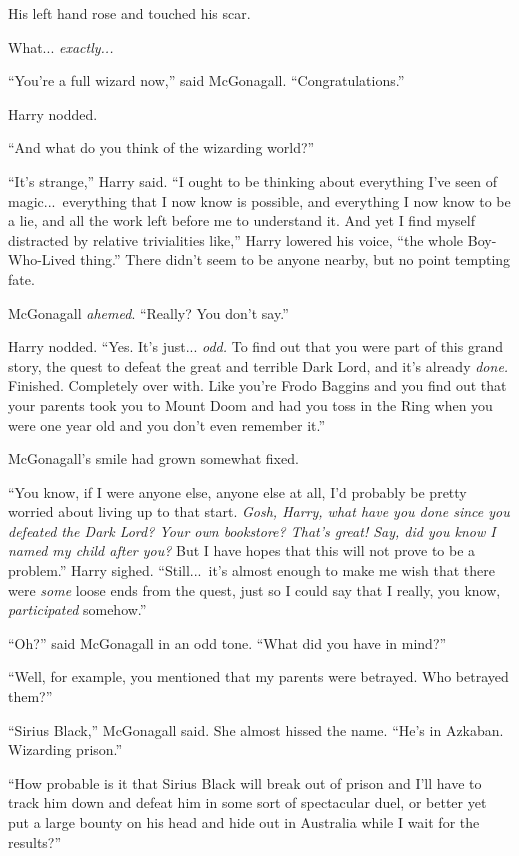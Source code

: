 His left hand rose and touched his scar.

What... \emph{exactly...}

“You’re a full wizard now,” said McGonagall. “Congratulations.”

Harry nodded.

“And what do you think of the wizarding world?”

“It’s strange,” Harry said. “I ought to be thinking about everything I’ve seen of magic...\ everything that I now know is possible, and everything I now know to be a lie, and all the work left before me to understand it. And yet I find myself distracted by relative trivialities like,” Harry lowered his voice, “the whole Boy-Who-Lived thing.” There didn’t seem to be anyone nearby, but no point tempting fate.

McGonagall \emph{ahemed}. “Really? You don’t say.”

Harry nodded. “Yes. It’s just... \emph{odd.} To find out that you were part of this grand story, the quest to defeat the great and terrible Dark Lord, and it’s already \emph{done.} Finished. Completely over with. Like you’re Frodo Baggins and you find out that your parents took you to Mount Doom and had you toss in the Ring when you were one year old and you don’t even remember it.”

McGonagall’s smile had grown somewhat fixed.

“You know, if I were anyone else, anyone else at all, I’d probably be pretty worried about living up to that start. \emph{Gosh, Harry, what have you done since you defeated the Dark Lord? Your own bookstore? That’s great! Say, did you know I named my child after you?} But I have hopes that this will not prove to be a problem.” Harry sighed. “Still...\ it’s almost enough to make me wish that there were \emph{some} loose ends from the quest, just so I could say that I really, you know, \emph{participated} somehow.”

“Oh?” said McGonagall in an odd tone. “What did you have in mind?”

“Well, for example, you mentioned that my parents were betrayed. Who betrayed them?”

“Sirius Black,” McGonagall said. She almost hissed the name. “He’s in Azkaban. Wizarding prison.”

“How probable is it that Sirius Black will break out of prison and I’ll have to track him down and defeat him in some sort of spectacular duel, or better yet put a large bounty on his head and hide out in Australia while I wait for the results?”

